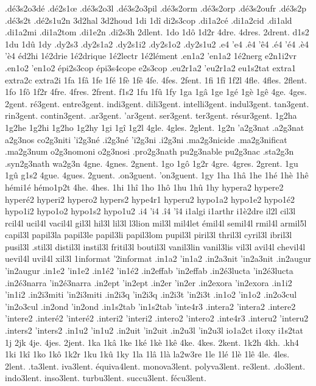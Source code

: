 {.dé3s2o3dé
.dé2s1œ
.dé3s2o3l
.dé3s2o3pil
.dé3s2orm
.dé3s2orp
.dé3s2oufr
.dé3s2p
.dé3s2t
.dé2s1u2n
3d2hal
3d2houd
1di
1dî
di2s3cop
.di1a2cé
.di1a2cid
.di1ald
.di1a2mi
.di1a2tom
.di1e2n
.di2s3h
2dlent.
1do
1dô
1d2r
4dre.
4dres.
2drent.
d1s2
1du
1dû
1dy
.dy2s3
.dy2s1a2
.dy2s1i2
.dy2s1o2
.dy2s1u2
.e4
'e4
.ê4
'ê4
.é4
'é4
.è4
'è4
éd2hi
1é2drie
1é2drique
1é2lectr
1é2lément
.en1a2
'en1a2
1é2nerg
e2n1i2vr
.en1o2
'en1o2
épi2s3cop
épi3s4cope
e2s3cop
.eu2r1a2
'eu2r1a2
eu1s2tat
extra1
extra2c
extra2i
1fa
1fâ
1fe
1fé
1fè
1fê
4fe.
4fes.
2fent.
1fi
1fî
1f2l
4fle.
4fles.
2flent.
1fo
1fô
1f2r
4fre.
4fres.
2frent.
f1s2
1fu
1fû
1fy
1ga
1gâ
1ge
1gé
1gè
1gê
4ge.
4ges.
2gent.
ré3gent.
entre3gent.
indi3gent.
dili3gent.
intelli3gent.
indul3gent.
tan3gent.
rin3gent.
contin3gent.
.ar3gent.
'ar3gent.
ser3gent.
ter3gent.
résur3gent.
1g2ha
1g2he
1g2hi
1g2ho
1g2hy
1gi
1gî
1g2l
4gle.
4gles.
2glent.
1g2n
'a2g3nat
.a2g3nat
a2g3nos
co2g3niti
'i2g3né
.i2g3né
'i2g3ni
.i2g3ni
.ma2g3nicide
.ma2g3nificat
.ma2g3num
o2g3nomoni
o2g3nosi
.pro2g3nath
pu2g3nable
pu2g3nac
.sta2g3n
.syn2g3nath
wa2g3n
4gne.
4gnes.
2gnent.
1go
1gô
1g2r
4gre.
4gres.
2grent.
1gu
1gû
g1s2
4gue.
4gues.
2guent.
.on3guent.
'on3guent.
1gy
1ha
1hâ
1he
1hé
1hè
1hê
hémi1é
hémo1p2t
4he.
4hes.
1hi
1hî
1ho
1hô
1hu
1hû
1hy
hypera2
hypere2
hyperé2
hyperi2
hypero2
hypers2
hype4r1
hyperu2
hypo1a2
hypo1e2
hypo1é2
hypo1i2
hypo1o2
hypo1s2
hypo1u2
.i4
'i4
.î4
'î4
i1algi
i1arthr
i1è2dre
il2l
cil3l
rcil4l
ucil4l
vacil4l
gil3l
hil3l
lil3l
l3lion
mil3l
mil4let
émil4l
semil4l
rmil4l
armil5l
capil3l
papil3la
papil3le
papil3li
papil3lom
pupil3l
piril3l
thril3l
cyril3l
ibril3l
pusil3l
.stil3l
distil3l
instil3l
fritil3l
boutil3l
vanil3lin
vanil3lis
vil3l
avil4l
chevil4l
uevil4l
uvil4l
xil3l
1informat
'2informat
.in1a2
'in1a2
.in2a3nit
'in2a3nit
.in2augur
'in2augur
.in1e2
'in1e2
.in1é2
'in1é2
.in2effab
'in2effab
.in2é3lucta
'in2é3lucta
.in2é3narra
'in2é3narra
.in2ept
'in2ept
.in2er
'in2er
.in2exora
'in2exora
.in1i2
'in1i2
.in2i3miti
'in2i3miti
.in2i3q
'in2i3q
.in2i3t
'in2i3t
.in1o2
'in1o2
.in2o3cul
'in2o3cul
.in2ond
'in2ond
.in1s2tab
'in1s2tab
'inte4r3
.intera2
'intera2
.intere2
'intere2
.interé2
'interé2
.interi2
'interi2
.intero2
'intero2
.inte4r3
.interu2
'interu2
.inters2
'inters2
.in1u2
'in1u2
.in2uit
'in2uit
.in2u3l
'in2u3l
io1a2ct
i1oxy
i1s2tat
1j
2jk
4je.
4jes.
2jent.
1ka
1kâ
1ke
1ké
1kè
1kê
4ke.
4kes.
2kent.
1k2h
4kh.
.kh4
1ki
1kî
1ko
1kô
1k2r
1ku
1kû
1ky
1la
1lâ
1là
la2w3re
1le
1lé
1lè
1lê
4le.
4les.
2lent.
.ta3lent.
iva3lent.
équiva4lent.
monova3lent.
polyva3lent.
re3lent.
.do3lent.
indo3lent.
inso3lent.
turbu3lent.
succu3lent.
fécu3lent.
}

